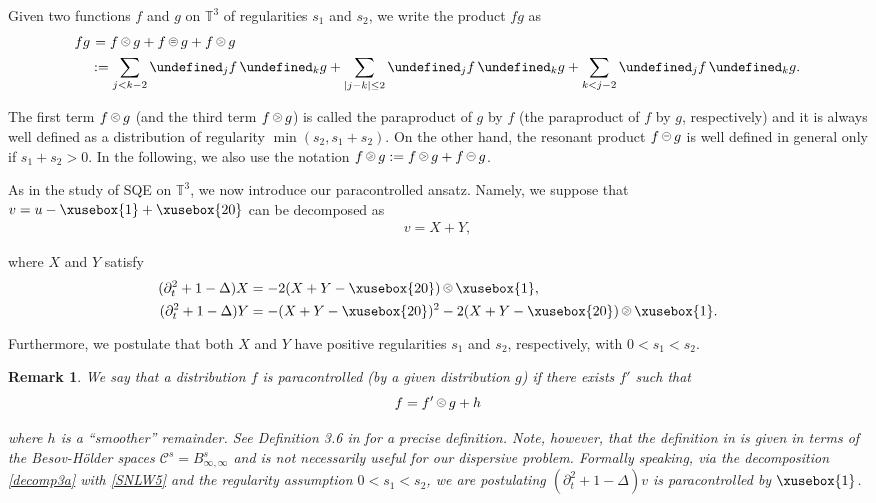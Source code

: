 \documentclass[%
11pt,  reqno]{amsart}
\def\<#1>{\xusebox{#1}}
\newcommand{\pe}{\mathbin{\scaleobj{0.7}{\tikz \draw (0,0) node[shape=circle,draw,inner sep=0pt,minimum size=8.5pt] {\scriptsize  $=$};}}}
\newcommand{\pl}{\mathbin{\scaleobj{0.7}{\tikz \draw (0,0) node[shape=circle,draw,inner sep=0pt,minimum size=8.5pt] {\scriptsize $<$};}}}
\newcommand{\pg}{\mathbin{\scaleobj{0.7}{\tikz \draw (0,0) node[shape=circle,draw,inner sep=0pt,minimum size=8.5pt] {\scriptsize $>$};}}}
\newcommand{\pge}{\mathbin{\scaleobj{0.7}{\tikz \draw (0,0) node[shape=circle,draw,inner sep=0pt,minimum size=8.5pt] {\scriptsize $\geqslant$};}}}
\newtheorem{remark}[theorem]{Remark}
\newcommand{\1}{\hspace{0.2mm}\text{I}\hspace{0.2mm}}
\newcommand{\noi}{\noindent}
\newcommand{\T}{\mathbb{T}}
\let\P= \undefined
\newcommand{\P}{\mathbf{P}}
\newcommand{\Dl}{\Delta}
\newcommand{\dt}{\partial_t}
\numberwithin{equation}{section}
\numberwithin{theorem}{section}
\begin{document}
 \noi
Given two functions $f$ and $g$ on $\T^3$
of regularities $s_1$ and $s_2$, 
we write the product $fg$ as
\begin{align}
fg & \hspace*{0.3mm}
= f\pl g + f \pe g + f \pg g\notag \\
& := \sum_{j < k-2} \P_{j} f \, \P_k g
+ \sum_{|j - k|  \leq 2} \P_{j} f\,  \P_k g
+ \sum_{k < j-2} \P_{j} f\,  \P_k g.
\label{para1}
\end{align}

\noi
The first term 
$f\pl g$ (and the third term $f\pg g$) is called the paraproduct of $g$ by $f$
(the paraproduct of $f$ by $g$, respectively)
and it is always well defined as a distribution
of regularity $\min(s_2, s_1+ s_2)$.
On the other hand, 
the resonant product $f \pe g$ is well defined in general 
only if $s_1 + s_2 > 0$.
In the following, we also use the notation $f\pge g := f\pg g + f\pe g$.




As in the study of SQE on $\T^3$, we now introduce our paracontrolled ansatz.
Namely, we suppose that $v = u - \<1> + \<20>$
can be decomposed as 
\begin{align}
v = X+ Y,
\label{decomp3a}
\end{align}

\noi
where $X$ and $Y$ satisfy
\begin{align}
 (\dt^2  +1 - \Dl) X  & = - 2 (X+Y-\<20>)\pl \<1>, \label{SNLW5}\\
 (\dt^2 +1  - \Dl) Y 
&  = - (X+Y-\<20>)^2 -  2(X+Y-\<20>)\pge \<1>.
\label{SNLW6}
\end{align}



\noi
Furthermore, 
we  postulate that both $X$ and $Y$ have positive regularities $s_1$ and $s_2$, respectively,
with $0 < s_1 < s_2$.


\begin{remark}\rm
We say that a distribution $f$ is paracontrolled (by a given distribution $g$)
if there exists $f'$ such that
\[ f= f' \pl g + h\]

\noi
where $h$ is a ``smoother'' remainder.
See Definition 3.6 in \cite{GIP}
for a precise definition.
Note, however, that the definition in \cite{GIP} 
is given in terms of the Besov-H\"older spaces $\mathcal{C}^s = B^s_{\infty, \infty}$
and is not necessarily useful for our dispersive problem.
Formally speaking, 
via the decomposition \eqref{decomp3a}
with \eqref{SNLW5} and the regularity assumption
$0 < s_1 < s_2$, 
we are postulating 
$(\dt^2  +1 - \Dl)v$ is paracontrolled by $\<1>$.


\end{remark}
\end{document}
